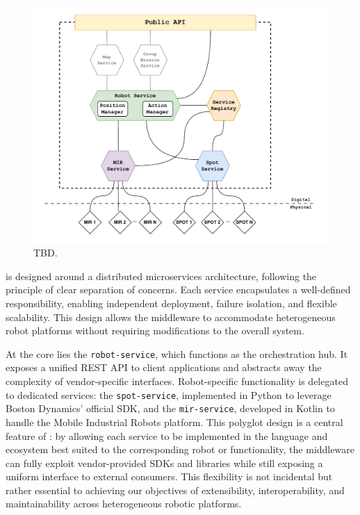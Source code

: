 \documentclass[conference]{IEEEtran}
\begin{document}
\begin{figure}[htb]
    \centering
    \includegraphics[width=1\columnwidth]{images/arc.pdf}
    \caption{
        TBD.
    }
    \label{fig:arc}
\end{figure}

\approach{} is designed around a distributed microservices architecture, 
 following the principle of clear separation of concerns. 
% 
Each service encapsulates a well-defined responsibility, 
 enabling independent deployment, failure isolation, and flexible scalability. 
% 
This design allows the middleware to accommodate heterogeneous robot platforms 
 without requiring modifications to the overall system.

At the core lies the \texttt{robot-service}, 
 which functions as the orchestration hub. 
% 
It exposes a unified REST API to client applications 
 and abstracts away the complexity of vendor-specific interfaces. 
% 
Robot-specific functionality is delegated to dedicated services: 
 the \texttt{spot-service}, implemented in Python to leverage Boston Dynamics' official SDK, 
 and the \texttt{mir-service}, developed in Kotlin to handle the Mobile Industrial Robots platform. 
% 
This polyglot design is a central feature of \approach{}: 
 by allowing each service to be implemented in the language 
 and ecosystem best suited to the corresponding robot or functionality,
  the middleware can fully exploit vendor-provided SDKs and libraries 
  while still exposing a uniform interface to external consumers. 
%  
This flexibility is not incidental but rather essential to achieving our objectives of 
 extensibility, interoperability, and maintainability across heterogeneous robotic platforms.
\end{document}
